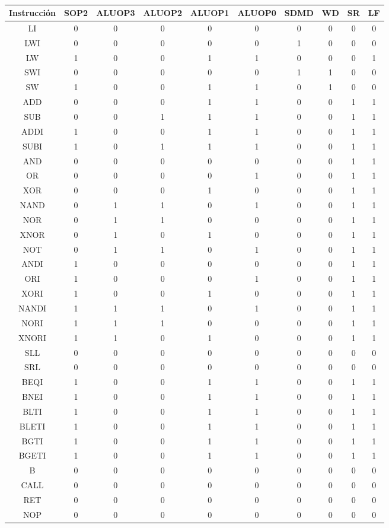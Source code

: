 \documentclass[8pt,executivepaper]{article}
\begin{document}
\\
\begin{tabular}{|c|c|c|c|c|c|c|c|c|c|}
  \hline
  Instrucción&SOP{\tiny2}&ALUOP{\tiny3}&ALUOP{\tiny2}&ALUOP{\tiny1}&ALUOP{\tiny0}&SDMD&WD&SR&LF\\\hline
  LI&0&0&0&0&0&0&0&0&0\\\hline
  LWI&0&0&0&0&0&1&0&0&0\\\hline
  LW&1&0&0&1&1&0&0&0&1\\\hline
  SWI&0&0&0&0&0&1&1&0&0\\\hline
  SW&1&0&0&1&1&0&1&0&0\\\hline
  ADD&0&0&0&1&1&0&0&1&1\\\hline
  SUB&0&0&1&1&1&0&0&1&1\\\hline
  ADDI&1&0&0&1&1&0&0&1&1\\\hline
  SUBI&1&0&1&1&1&0&0&1&1\\\hline
  AND&0&0&0&0&0&0&0&1&1\\\hline
  OR&0&0&0&0&1&0&0&1&1\\\hline
  XOR&0&0&0&1&0&0&0&1&1\\\hline
  NAND&0&1&1&0&1&0&0&1&1\\\hline
  NOR&0&1&1&0&0&0&0&1&1\\\hline
  XNOR&0&1&0&1&0&0&0&1&1\\\hline
  NOT&0&1&1&0&1&0&0&1&1\\\hline
  ANDI&1&0&0&0&0&0&0&1&1\\\hline
  ORI&1&0&0&0&1&0&0&1&1\\\hline
  XORI&1&0&0&1&0&0&0&1&1\\\hline
  NANDI&1&1&1&0&1&0&0&1&1\\\hline
  NORI&1&1&1&0&0&0&0&1&1\\\hline
  XNORI&1&1&0&1&0&0&0&1&1\\\hline
  SLL&0&0&0&0&0&0&0&0&0\\\hline
  SRL&0&0&0&0&0&0&0&0&0\\\hline
  BEQI&1&0&0&1&1&0&0&1&1\\\hline
  BNEI&1&0&0&1&1&0&0&1&1\\\hline
  BLTI&1&0&0&1&1&0&0&1&1\\\hline
  BLETI&1&0&0&1&1&0&0&1&1\\\hline
  BGTI&1&0&0&1&1&0&0&1&1\\\hline
  BGETI&1&0&0&1&1&0&0&1&1\\\hline
  B&0&0&0&0&0&0&0&0&0\\\hline
  CALL&0&0&0&0&0&0&0&0&0\\\hline
  RET&0&0&0&0&0&0&0&0&0\\\hline
  NOP&0&0&0&0&0&0&0&0&0\\\hline
\end{tabular}
\end{document}
